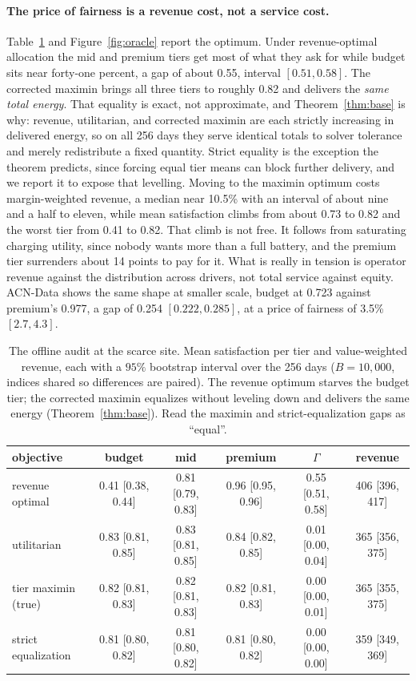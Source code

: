 \documentclass[manuscript, screen, review, anonymous]{acmart}
\begin{document}
\paragraph{The price of fairness is a revenue cost, not a service cost.}
Table~\ref{tab:oracle} and Figure~\ref{fig:oracle} report the optimum. Under revenue-optimal allocation the mid and premium tiers get most of what they ask for while budget sits near forty-one percent, a gap of about 0.55, interval $[0.51, 0.58]$. The corrected maximin brings all three tiers to roughly 0.82 and delivers the \emph{same total energy}. That equality is exact, not approximate, and Theorem~\ref{thm:base} is why: revenue, utilitarian, and corrected maximin are each strictly increasing in delivered energy, so on all 256 days they serve identical totals to solver tolerance and merely redistribute a fixed quantity. Strict equality is the exception the theorem predicts, since forcing equal tier means can block further delivery, and we report it to expose that levelling. Moving to the maximin optimum costs margin-weighted revenue, a median near 10.5\% with an interval of about nine and a half to eleven, while mean satisfaction climbs from about 0.73 to 0.82 and the worst tier from 0.41 to 0.82. That climb is not free. It follows from saturating charging utility, since nobody wants more than a full battery, and the premium tier surrenders about 14 points to pay for it. What is really in tension is operator revenue against the distribution across drivers, not total service against equity. ACN-Data shows the same shape at smaller scale, budget at 0.723 against premium's 0.977, a gap of 0.254 $[0.222, 0.285]$, at a price of fairness of 3.5\% $[2.7, 4.3]$.

\begin{table}[t]
\centering
\small
\setlength{\tabcolsep}{3.5pt}
\caption{The offline audit at the scarce site. Mean satisfaction per tier and value-weighted revenue, each with a $95\%$ bootstrap interval over the 256 days ($B=10{,}000$, indices shared so differences are paired). The revenue optimum starves the budget tier; the corrected maximin equalizes without leveling down and delivers the same energy (Theorem~\ref{thm:base}). Read the maximin and strict-equalization gaps as ``equal''.}
\label{tab:oracle}
\begin{tabular}{lccccc}
\toprule
objective & budget & mid & premium & $\Gamma$ & revenue \\
\midrule
revenue optimal     & 0.41 [0.38, 0.44] & 0.81 [0.79, 0.83] & 0.96 [0.95, 0.96] & 0.55 [0.51, 0.58] & 406 [396, 417] \\
utilitarian         & 0.83 [0.81, 0.85] & 0.83 [0.81, 0.85] & 0.84 [0.82, 0.85] & 0.01 [0.00, 0.04] & 365 [356, 375] \\
tier maximin (true) & 0.82 [0.81, 0.83] & 0.82 [0.81, 0.83] & 0.82 [0.81, 0.83] & 0.00 [0.00, 0.01] & 365 [355, 375] \\
strict equalization & 0.81 [0.80, 0.82] & 0.81 [0.80, 0.82] & 0.81 [0.80, 0.82] & 0.00 [0.00, 0.00] & 359 [349, 369] \\
\bottomrule
\end{tabular}
\end{table}
\end{document}
